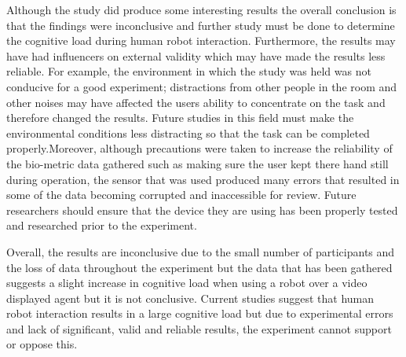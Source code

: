 \documentclass[conference]{IEEEtran}
\begin{document}
Although the study did produce some interesting results the overall conclusion is that the findings were inconclusive and further study must be done to determine the cognitive load during human robot interaction. Furthermore, the results may have had influencers on external validity which may have made the results less reliable. For example, the environment in which the study was held was not conducive for a good experiment; distractions from other people in the room and other noises may have affected the users ability to concentrate on the task and therefore changed the results. Future studies in this field must make the environmental conditions less distracting so that the task can be completed properly.\newline Moreover, although precautions were taken to increase the reliability of the bio-metric data gathered such as making sure the user kept there hand still during operation, the sensor that was used produced many errors that resulted in some of the data becoming corrupted and inaccessible for review. Future researchers should ensure that the device they are using has been properly tested and researched prior to the experiment. \newline

Overall, the results are inconclusive due to the small number of participants and the loss of data throughout the experiment but the data that has been gathered suggests a slight increase in cognitive load when using a robot over a video displayed agent but it is not conclusive. Current studies \cite{bainbridge2011benefits} suggest that human robot interaction results in a large cognitive load but due to experimental errors and lack of significant, valid and reliable results, the experiment cannot support or oppose this.


\end{document}
